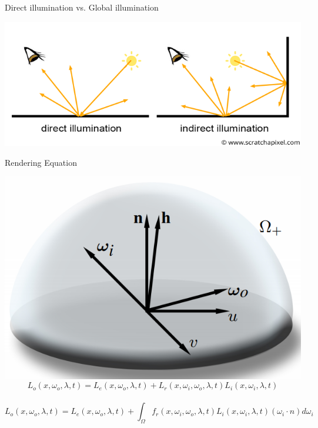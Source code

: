 \documentclass[xcolor=table]{beamer}
\begin{document}
\begin{frame}{Direct illumination vs. Global illumination}

	\includegraphics[scale=0.65]{media/shad2-globalillum3.png}

\end{frame}

\begin{frame}{Rendering Equation}

	\includegraphics[scale=0.35]{media/Rendering_eq.png}
$$
L_o(x,\omega_o,\lambda,t) = L_e(x,\omega_o,\lambda,t) + L_r(x,\omega_i,\omega_o,\lambda,t)L_i(x,\omega_i,\lambda,t)
$$ 
\\
$$
L_o(x,\omega_o,\lambda,t) = L_e(x,\omega_o,\lambda,t) + \int_\Omega f_r(x,\omega_i,\omega_o,\lambda,t)L_i(x,\omega_i,\lambda,t)(\omega_i \cdot n) d\omega_i
$$

\end{frame}
\end{document}
